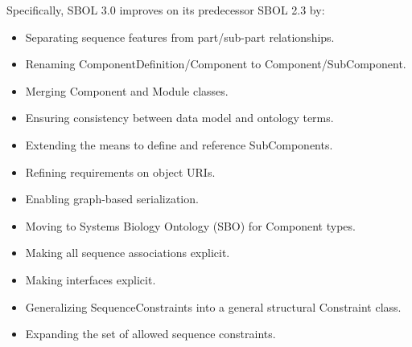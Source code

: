 Specifically, SBOL 3.0 improves on its predecessor SBOL 2.3 by:
\begin{itemize}
\item Separating sequence features from part/sub-part relationships.
\item Renaming ComponentDefinition/Component to Component/SubComponent.
\item Merging Component and Module classes.
\item Ensuring consistency between data model and ontology terms.
\item Extending the means to define and reference SubComponents.
\item Refining requirements on object URIs.
\item Enabling graph-based serialization.
\item Moving to Systems Biology Ontology (SBO) for Component types.
\item Making all sequence associations explicit.
\item Making interfaces explicit.
\item Generalizing SequenceConstraints into a general structural Constraint class.
\item Expanding the set of allowed sequence constraints.
\end{itemize}

